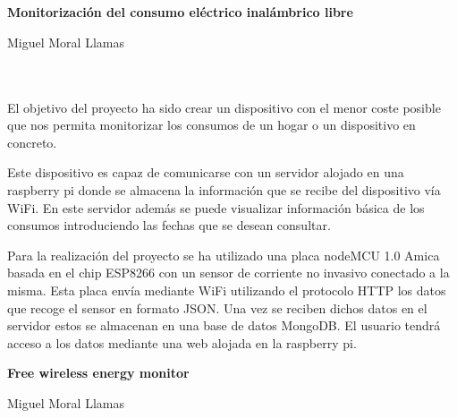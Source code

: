 \chapter*{}






\cleardoublepage
\thispagestyle{empty}

\begin{center}
{\large\bfseries Monitorización del consumo eléctrico inalámbrico libre}\\
\end{center}
\begin{center}
Miguel Moral Llamas\\
\end{center}

\\

\vspace{0.7cm}
\\

El objetivo del proyecto ha sido crear un dispositivo con el menor coste posible que nos permita monitorizar los consumos de un hogar o un dispositivo en concreto.

Este dispositivo es capaz de comunicarse con un servidor alojado en una raspberry pi donde se almacena la información que se recibe del dispositivo vía WiFi. En este servidor además se puede visualizar información básica de los consumos introduciendo las fechas que se desean consultar.

Para la realización del proyecto se ha utilizado una placa nodeMCU 1.0 Amica basada en el chip ESP8266 con un sensor de corriente no invasivo conectado a la misma. Esta placa envía mediante WiFi utilizando el protocolo HTTP los datos que recoge el sensor en formato JSON. Una vez se reciben dichos datos en el servidor estos se almacenan en una base de datos MongoDB. El usuario tendrá acceso a los datos mediante una web alojada en la raspberry pi. 
\cleardoublepage


\thispagestyle{empty}


\begin{center}
{\large\bfseries Free wireless energy monitor }\\
\end{center}
\begin{center}
Miguel Moral Llamas\\
\end{center}

